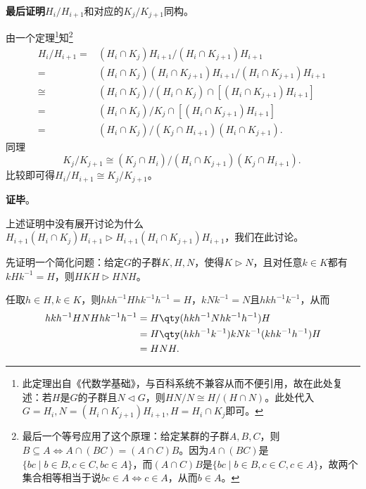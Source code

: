 \textbf{最后证明}$H_i/H_{i+1}$和对应的$K_j/K_{j+1}$同构。

由一个定理\footnote{此定理出自《代数学基础》，与百科系统不兼容从而不便引用，故在此处复述：若$H$是$G$的子群且$N\lhd G$，则$HN/N\cong H/(H\cap N)$。此处代入$G=H_i, N=(H_i\cap K_{j+1})H_{i+1}, H=H_i\cap K_j$即可。}知\footnote{最后一个等号应用了这个原理：给定某群的子群$A, B, C$，则$B\subseteq A \iff A\cap(BC)=(A\cap C)B$。因为$A\cap (BC)$是$\{bc\mid b\in B, c\in C, bc\in A\}$，而$(A\cap C)B$是$\{bc\mid b\in B, c\in C, c\in A\}$，故两个集合相等相当于说$bc\in A\iff c\in A$，从而$b\in A$。}
\begin{equation}
    \begin{aligned}
    H_i/H_{i+1} ={}& (H_i\cap K_j)H_{i+1} / (H_i\cap K_{j+1})H_{i+1}\\
    ={}& (H_i\cap K_j)(H_i\cap K_{j+1})H_{i+1} / (H_i\cap K_{j+1})H_{i+1}\\
    \cong{}& (H_i\cap K_j) / (H_i\cap K_j)\cap[(H_i\cap K_{j+1})H_{i+1}]\\
    ={}& (H_i\cap K_j) / K_j\cap[(H_i\cap K_{j+1})H_{i+1}]\\
    ={}& (H_i\cap K_j) / (K_j\cap H_{i+1})(H_i\cap K_{j+1}). 
    \end{aligned}
~\end{equation}
同理
\begin{equation}
    K_j/K_{j+1} \cong (K_j\cap H_i)/(H_i\cap K_{j+1})(K_j\cap H_{i+1}). 
~\end{equation}
比较即可得$H_i/H_{i+1} \cong K_j/K_{j+1}$。



\textbf{证毕}。



上述证明中没有展开讨论为什么
$H_{i+1}(H_i\cap K_j)H_{i+1}\rhd H_{i+1}(H_i\cap K_{j+1})H_{i+1}$，我们在此讨论。

先证明一个简化问题：给定$G$的子群$K, H, N$，使得$K\rhd N$，且对任意$k\in K$都有$kHk^{-1}=H$，则$HKH\rhd HNH$。

任取$h\in H, k\in K$，则$hkh^{-1} H hk^{-1}h^{-1}=H$，$kNk^{-1}=N$且$hkh^{-1}k^{-1}$，从而
\begin{equation}
    \begin{aligned}
    hkh^{-1} HNH hk^{-1}h^{-1} ={}&  H\qty(hkh^{-1} N hk^{-1}h^{-1})H\\
    ={}& H\qty(hkh^{-1} k^{-1} )k N k^{-1} (k hk^{-1}h^{-1})H\\
    ={}& HNH. 
    \end{aligned}
\end{equation}

